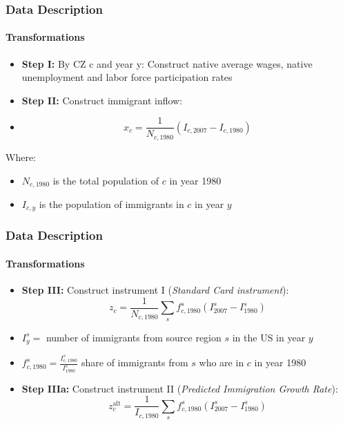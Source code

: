 \begin{frame}
    \frametitle{Data Description}
    \framesubtitle{Transformations}
    \begin{itemize}
        \item \textbf{Step I:} By CZ c and year y: Construct native average wages, native unemployment and labor force participation rates
    \end{itemize}
    \begin{itemize}
        \item \textbf{Step II:} Construct immigrant inflow: 
        \item \[x_c = \frac{1}{N_{c,1980}} \left(I_{c,2007} - I_{c,1980}\right)\]
    \end{itemize}

    Where:
    \begin{itemize}
        \item $N_{c,1980}$ is the total population of $c$ in year 1980
        \item $I_{c,y}$ is the population of immigrants in $c$ in year $y$
    \end{itemize}
\end{frame}
\begin{frame}
    \frametitle{Data Description}
    \framesubtitle{Transformations}
    \begin{itemize}
        \item \textbf{Step III:} Construct instrument I (\emph{Standard Card instrument}): 
        \[z_c = \frac{1}{N_{c,1980}} \sum_s f^s_{c,1980} \left(I^s_{2007} - I^s_{1980}\right)\]
    \end{itemize}
    \begin{itemize}
        \item $I^s_y = $ number of immigrants from source region $s$ in the US in year $y$
        \item $f^s_{c,1980} = \frac{I^s_{c,1980}}{I^s_{1980}}$ share of immigrants from $s$ who are in $c$ in year 1980
    \end{itemize}
    \begin{itemize}
        \item \textbf{Step IIIa:} Construct instrument II (\emph{Predicted Immigration Growth Rate}):
        \[z_c^{\text{alt}} = \frac{1}{I_{c,1980}} \sum_s f^s_{c,1980} \left(I^s_{2007} - I^s_{1980}\right)\]
    \end{itemize}

\end{frame}

